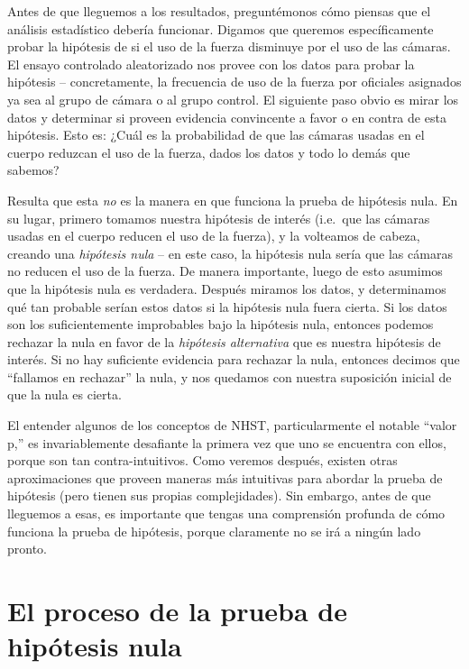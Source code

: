 \documentclass[
  12pt,
]{book}
\begin{document}
Antes de que lleguemos a los resultados, preguntémonos cómo piensas que el análisis estadístico debería funcionar. Digamos que queremos específicamente probar la hipótesis de si el uso de la fuerza disminuye por el uso de las cámaras. El ensayo controlado aleatorizado nos provee con los datos para probar la hipótesis -- concretamente, la frecuencia de uso de la fuerza por oficiales asignados ya sea al grupo de cámara o al grupo control. El siguiente paso obvio es mirar los datos y determinar si proveen evidencia convincente a favor o en contra de esta hipótesis. Esto es: ¿Cuál es la probabilidad de que las cámaras usadas en el cuerpo reduzcan el uso de la fuerza, dados los datos y todo lo demás que sabemos?

Resulta que esta \emph{no} es la manera en que funciona la prueba de hipótesis nula. En su lugar, primero tomamos nuestra hipótesis de interés (i.e.~que las cámaras usadas en el cuerpo reducen el uso de la fuerza), y la volteamos de cabeza, creando una \emph{hipótesis nula} -- en este caso, la hipótesis nula sería que las cámaras no reducen el uso de la fuerza. De manera importante, luego de esto asumimos que la hipótesis nula es verdadera. Después miramos los datos, y determinamos qué tan probable serían estos datos si la hipótesis nula fuera cierta. Si los datos son los suficientemente improbables bajo la hipótesis nula, entonces podemos rechazar la nula en favor de la \emph{hipótesis alternativa} que es nuestra hipótesis de interés. Si no hay suficiente evidencia para rechazar la nula, entonces decimos que ``fallamos en rechazar'' la nula, y nos quedamos con nuestra suposición inicial de que la nula es cierta.

El entender algunos de los conceptos de NHST, particularmente el notable ``valor p,'' es invariablemente desafiante la primera vez que uno se encuentra con ellos, porque son tan contra-intuitivos. Como veremos después, existen otras aproximaciones que proveen maneras más intuitivas para abordar la prueba de hipótesis (pero tienen sus propias complejidades). Sin embargo, antes de que lleguemos a esas, es importante que tengas una comprensión profunda de cómo funciona la prueba de hipótesis, porque claramente no se irá a ningún lado pronto.

\hypertarget{el-proceso-de-la-prueba-de-hipuxf3tesis-nula}{%
\section{El proceso de la prueba de hipótesis nula}\label{el-proceso-de-la-prueba-de-hipuxf3tesis-nula}}
\end{document}
